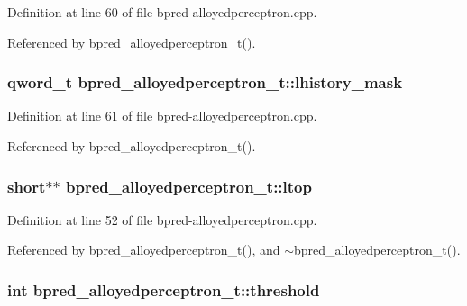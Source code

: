 Definition at line 60 of file bpred-alloyedperceptron.cpp.

Referenced by bpred\_\-alloyedperceptron\_\-t().
\subsubsection[{lhistory\_\-mask}]{\setlength{\rightskip}{0pt plus 5cm}qword\_\-t {\bf bpred\_\-alloyedperceptron\_\-t::lhistory\_\-mask}\hspace{0.3cm}{\tt  [protected]}}\label{classbpred__alloyedperceptron__t_50b6c1a3608fbbac1fc7699fe5d1072a}




Definition at line 61 of file bpred-alloyedperceptron.cpp.

Referenced by bpred\_\-alloyedperceptron\_\-t().
\subsubsection[{ltop}]{\setlength{\rightskip}{0pt plus 5cm}short$\ast$$\ast$ {\bf bpred\_\-alloyedperceptron\_\-t::ltop}\hspace{0.3cm}{\tt  [protected]}}\label{classbpred__alloyedperceptron__t_35f98da5832c4582e23966ad9dbb4c3b}




Definition at line 52 of file bpred-alloyedperceptron.cpp.

Referenced by bpred\_\-alloyedperceptron\_\-t(), and $\sim$bpred\_\-alloyedperceptron\_\-t().
\subsubsection[{threshold}]{\setlength{\rightskip}{0pt plus 5cm}int {\bf bpred\_\-alloyedperceptron\_\-t::threshold}\hspace{0.3cm}{\tt  [protected]}}\label{classbpred__alloyedperceptron__t_36cdca7285239cd7208f37c175f45146}




